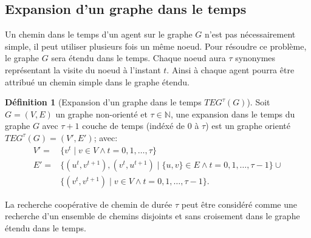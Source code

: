 \documentclass[french, 12pt, letterpaper]{article}
\theoremstyle{definition}
\newtheorem{definition}{Définition}[subsection]
\theoremstyle{proposition}
\theoremstyle{example}
\begin{document}
    \subsection{Expansion d'un graphe dans le temps}

    Un chemin dans le temps d'un agent sur le graphe $G$ n'est pas nécessairement simple, il peut utiliser plusieurs fois un même noeud.
    Pour résoudre ce problème, le graphe $G$ sera étendu dans le temps. 
    Chaque noeud aura $\tau$ synonymes représentant la visite du noeud à l'instant $t$.
    Ainsi à chaque agent pourra être attribué un chemin simple dans le graphe étendu.

    \begin{definition}[Expansion d'un graphe dans le temps $TEG^\tau(G)$]
        Soit $G = ( V, E )$ un graphe non-orienté et $\tau\in \mathbb{N}$,
        une expansion dans le temps du graphe $G$ avec $\tau + 1$ couche de temps (indéxé de $0$ à $\tau$) est un graphe orienté
        $TEG^\tau(G) = ( V', E' )$; avec:
        \begin{align*}
            V' = &\{v^t\;|\;v \in V \land t = 0, 1, \ldots, \tau\}\\
            E' = &\{( u^t, v^{t+1} ), ( v^t, u^{t+1} )\;|\;\{u, v\}\in E \land t= 0, 1, \ldots, \tau - 1\} \cup\\
            &\{( v^t, v^{t+1} )\;|\;v\in V \land t= 0, 1, \ldots, \tau - 1\}.
        \end{align*} 
    \end{definition}

    La recherche coopérative de chemin de durée $\tau$ peut être considéré comme une recherche d'un ensemble de chemins disjoints et sans croisement
    dans le graphe étendu dans le temps.
\end{document}
